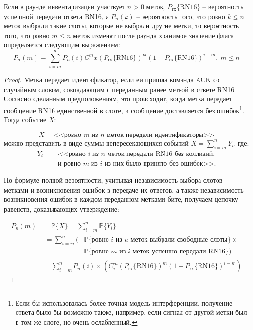 \begin{prop}\label{prop:ch3_pnm}
	Если в раунде инвентаризации участвует $n > 0$ меток, $P_\text{rx}\{\text{RN16}\}$ -- вероятность успешной передачи ответа RN16, а $\overline{P}_n(k)$ -- вероятность того, что ровно $k \leqslant n$ меток выбрали такие слоты, которые не выбрали другие метки, то вероятность того, что ровно $m \leqslant n$ меток изменят после раунда хранимое значение флага определяется следующим выражением:
	\begin{equation}\label{eq:ch3_pnm}
		P_n(m) = \sum\limits_{i=m}^{n}\overline{P}_n(i) C_i^mx \left(P_\text{rx}\{\text{RN16}\}\right)^m
			\left(1 - P_\text{rx}\{\text{RN16}\}\right)^{i - m},\; m \leqslant n
	\end{equation}
\end{prop}
\begin{proof}
	Метка передает идентификатор, если ей пришла команда ACK со случайным словом, совпадающим с переданным ранее меткой в ответе RN16. Согласно сделанным предположениям, это происходит, когда метка передает сообщение RN16 единственной в слоте, и сообщение доставляется без ошибок\footnote{Если бы использовалась более точная модель интерференции, получение ответа было бы возможно также, например, если сигнал от другой метки был в том же слоте, но очень ослабленный.}. Тогда событие $X$:

	$$
	X = \text{<<ровно $m$ из $n$ меток передали идентификаторы>>}
	$$
	можно представить в виде суммы непересекающихся событий $X = \sum\limits_{i=m}^n Y_i$, где:
	$$
	\begin{aligned}
	Y_i = &\text{<<ровно $i$ из $n$ меток передали RN16 без коллизий,}\\
		  &\text{и ровно $m$ из $i$ из них было принято без ошибок>>}.
	\end{aligned}
	$$

	По формуле полной вероятности, учитывая независимость выбора слотов метками и возникновения ошибок в передаче их ответов, а также независимость возникновения ошибок в каждом переданном метками бите, получаем цепочку равенств, доказывающих утверждение:

	\begin{align*}
		P_n(m) &= \mathbb{P}\{X\} = \sum\limits_{i=m}^{n} \mathbb{P}\{Y_i\}\\
		&\begin{aligned}= \sum\limits_{i=m}^{n}(
			&\mathbb{P}\{\text{ровно $i$ из $n$ меток выбрали свободные слоты}\} \times\\
			& \mathbb{P}\{\text{ровно $m$ из $i$ меток успешно передали RN16}\})
			\end{aligned}\\
		&=\sum\limits_{i=m}^{n} \overline{P}_n(i) \times \left(C_i^m(P_\text{rx}\{\text{RN16}\})^m
			(1 - P_\text{rx}\{\text{RN16}\})^{i - m}\right)
	\end{align*}

\end{proof}

